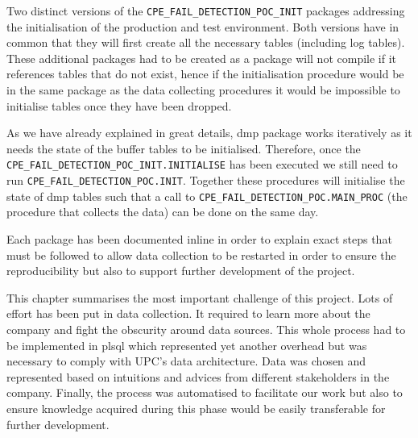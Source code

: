 Two distinct versions of the \texttt{CPE\_FAIL\_DETECTION\_POC\_INIT} packages addressing the initialisation of the production and test environment. Both versions have in common that they will first create all the necessary tables (including log tables). These additional packages had to be created as a package will not compile if it references tables that do not exist, hence if the initialisation procedure would be in the same package as the data collecting procedures it would be impossible to initialise tables once they have been dropped.

As we have already explained in great details, \acrshort{dmp} package works iteratively as it needs the state of the buffer tables to be initialised. Therefore, once the \texttt{CPE\_FAIL\_DETECTION\_POC\_INIT.INITIALISE} has been executed we still need to run \texttt{CPE\_FAIL\_DETECTION\_POC.INIT}. Together these procedures will initialise the state of \acrshort{dmp} tables such that a call to \texttt{CPE\_FAIL\_DETECTION\_POC.MAIN\_PROC} (the procedure that collects the data) can be done on the same day. 

Each package has been documented inline in order to explain exact steps that must be followed to allow data collection to be restarted in order to ensure the reproducibility but also to support further development of the project.

\vspace{1 \baselineskip} 
This chapter summarises the most important challenge of this project. Lots of effort has been put in data collection. It required to learn more about the company and fight the obscurity around data sources. This whole process had to be implemented in \acrshort{plsql} which represented yet another overhead but was necessary to comply with UPC's data architecture. Data was chosen and represented based on intuitions and advices from different stakeholders in the company. Finally, the process was automatised to facilitate our work but also to ensure knowledge acquired during this phase would be easily transferable for further development. 